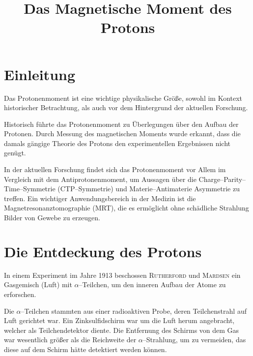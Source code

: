 \documentclass[sn-mathphys-num,iicol]{sn-jnl}
\theoremstyle{thmstyleone}
\theoremstyle{thmstyletwo}
\theoremstyle{thmstylethree}
\begin{document}
        
\title[Title]{Das Magnetische Moment des Protons}
\author*[1]{ }


\maketitle

\section{Einleitung}
Das Protonenmoment ist eine wichtige physikalische Größe, sowohl im Kontext historischer Betrachtung, als auch vor dem Hintergrund der aktuellen Forschung.

Historisch führte das Protonenmoment zu Überlegungen über den Aufbau der Protonen.
Durch Messung des magnetischen Moments wurde erkannt, dass die damals gängige Theorie des Protons den experimentellen Ergebnissen nicht genügt.

In der aktuellen Forschung findet sich das Protonenmoment vor Allem im Vergleich mit dem Antiprotonenmoment, um Aussagen über die Charge--Parity--Time--Symmetrie (CTP--Symmetrie) und Materie--Antimaterie Asymmetrie zu treffen.
Ein wichtiger Anwendungsbereich in der Medizin ist die Magnetresonanztomographie (MRT), die es ermöglicht ohne schädliche Strahlung Bilder von Gewebe zu erzeugen.

\section{Die Entdeckung des Protons}
In einem Experiment im Jahre 1913 beschossen \textsc{Rutherford} und \textsc{Mardsen} ein Gasgemisch (Luft) mit $\alpha $--Teilchen, um den inneren Aufbau der Atome zu erforschen.

Die $\alpha $--Teilchen stammten aus einer radioaktiven Probe, deren Teilchenstrahl auf Luft gerichtet war.
Ein Zinksulfidschirm war um die Luft herum angebracht, welcher als Teilchendetektor diente.
Die Entfernung des Schirms von dem Gas war wesentlich größer als die Reichweite der $\alpha $--Strahlung, um zu vermeiden, das diese auf dem Schirm hätte detektiert werden können.
\end{document}
